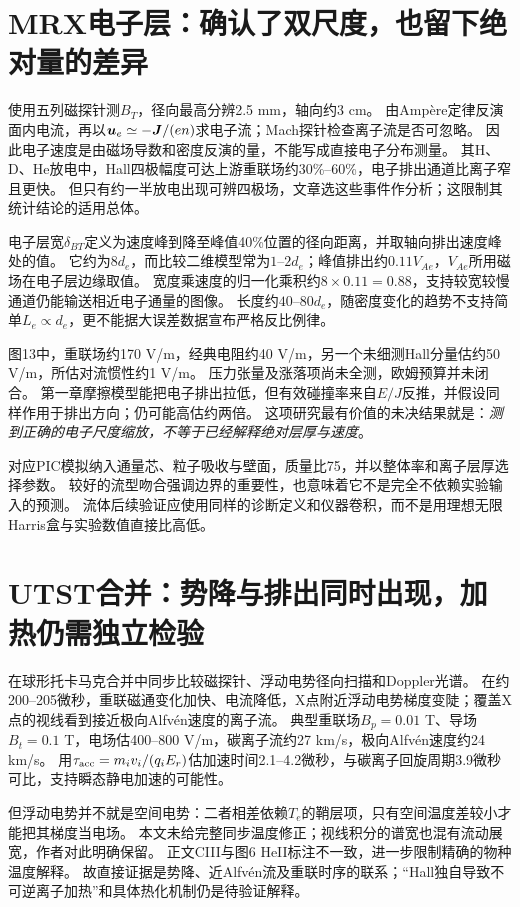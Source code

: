 \section{MRX电子层：确认了双尺度，也留下绝对量的差异}
\citet{L119}使用五列磁探针测$B_T$，径向最高分辨2.5 mm，轴向约3 cm。
由Ampère定律反演面内电流，再以$\bm{u}_e\simeq-\bm{J}/(en)$求电子流；Mach探针检查离子流是否可忽略。
因此电子速度是由磁场导数和密度反演的量，不能写成直接电子分布测量。
其H、D、He放电中，Hall四极幅度可达上游重联场约30\%--60\%，电子排出通道比离子窄且更快。
但只有约一半放电出现可辨四极场，文章选这些事件作分析；这限制其统计结论的适用总体。

电子层宽$\delta_{BT}$定义为速度峰到降至峰值40\%位置的径向距离，并取轴向排出速度峰处的值。
它约为$8d_e$，而比较二维模型常为$1$--$2d_e$；峰值排出约$0.11V_{\!Ae}$，$V_{\!Ae}$所用磁场在电子层边缘取值。
宽度乘速度的归一化乘积约$8\times0.11=0.88$，支持较宽较慢通道仍能输送相近电子通量的图像。
长度约$40$--$80d_e$，随密度变化的趋势不支持简单$L_e\propto d_e$，更不能据大误差数据宣布严格反比例律。

图13中，重联场约170 V/m，经典电阻约40 V/m，另一个未细测Hall分量估约50 V/m，所估对流惯性约1 V/m。
压力张量及涨落项尚未全测，欧姆预算并未闭合。
第一章摩擦模型能把电子排出拉低，但有效碰撞率来自$E/J$反推，并假设同样作用于排出方向；仍可能高估约两倍。
这项研究最有价值的未决结果就是：\emph{测到正确的电子尺度缩放，不等于已经解释绝对层厚与速度}。

对应PIC模拟纳入通量芯、粒子吸收与壁面，质量比75，并以整体率和离子层厚选择参数。
较好的流型吻合强调边界的重要性，也意味着它不是完全不依赖实验输入的预测。
流体后续验证应使用同样的诊断定义和仪器卷积，而不是用理想无限Harris盒与实验数值直接比高低。

\section{UTST合并：势降与排出同时出现，加热仍需独立检验}
\citet{L189}在球形托卡马克合并中同步比较磁探针、浮动电势径向扫描和Doppler光谱。
在约200--205微秒，重联磁通变化加快、电流降低，X点附近浮动电势梯度变陡；覆盖X点的视线看到接近极向Alfvén速度的离子流。
典型重联场$B_p=0.01$ T、导场$B_t=0.1$ T，电场估400--800 V/m，碳离子流约27 km/s，极向Alfvén速度约24 km/s。
用$\tau_{\rm acc}=m_iv_i/(q_iE_r)$估加速时间2.1--4.2微秒，与碳离子回旋周期3.9微秒可比，支持瞬态静电加速的可能性。

但浮动电势并不就是空间电势：二者相差依赖$T_e$的鞘层项，只有空间温度差较小才能把其梯度当电场。
本文未给完整同步温度修正；视线积分的谱宽也混有流动展宽，作者对此明确保留。
正文CIII与图6 HeII标注不一致，进一步限制精确的物种温度解释。
故直接证据是势降、近Alfvén流及重联时序的联系；“Hall独自导致不可逆离子加热”和具体热化机制仍是待验证解释。

